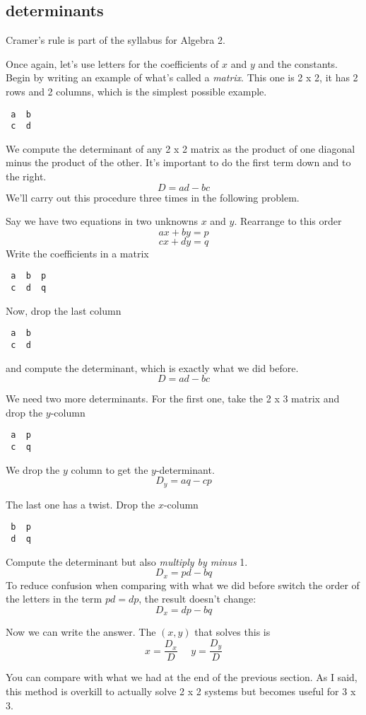 \documentclass[11pt, oneside]{article}
\begin{document}
\subsection*{determinants}

Cramer's rule is part of the syllabus for Algebra 2.  

Once again, let's use letters for the coefficients of $x$ and $y$ and the constants.  Begin by writing an example of what's called a \emph{matrix}.  This one is 2 x 2, it has 2 rows and 2 columns, which is the simplest possible example.
\begin{verbatim}
 a  b
 c  d
\end{verbatim}
We compute the determinant of any 2 x 2 matrix as the product of one diagonal minus the product of the other.  It's important to do the first term down and to the right.
\[ D = ad - bc \]
We'll carry out this procedure three times in the following problem.

Say we have two equations in two unknowns $x$ and $y$.  Rearrange to this order
\[ ax + by = p \]
\[ cx + dy = q \]
Write the coefficients in a matrix
\begin{verbatim}
 a  b  p
 c  d  q
\end{verbatim}

Now, drop the last column
\begin{verbatim}
 a  b
 c  d
\end{verbatim}
and compute the determinant, which is exactly what we did before.
\[ D = ad - bc \]

We need two more determinants.  For the first one, take the 2 x 3 matrix and drop the $y$-column
\begin{verbatim}
 a  p
 c  q
\end{verbatim}
We drop the $y$ column to get the $y$-determinant.
\[ D_y = aq - cp \]

The last one has a twist.  Drop the $x$-column
\begin{verbatim}
 b  p
 d  q
\end{verbatim}
Compute the determinant but also \emph{multiply by minus} 1.
\[ D_x = pd - bq \]
To reduce confusion when comparing with what we did before switch the order of the letters in the term $pd = dp$, the result doesn't change:
\[ D_x = dp - bq \]

Now we can write the answer.  The $(x,y)$ that solves this is
\[ x = \frac{D_x}{D} \ \ \ \ \ \ y = \frac{D_y}{D}  \]

You can compare with what we had at the end of the previous section.  As I said, this method is overkill to actually solve 2 x 2 systems but becomes useful for 3 x 3.
\end{document}
